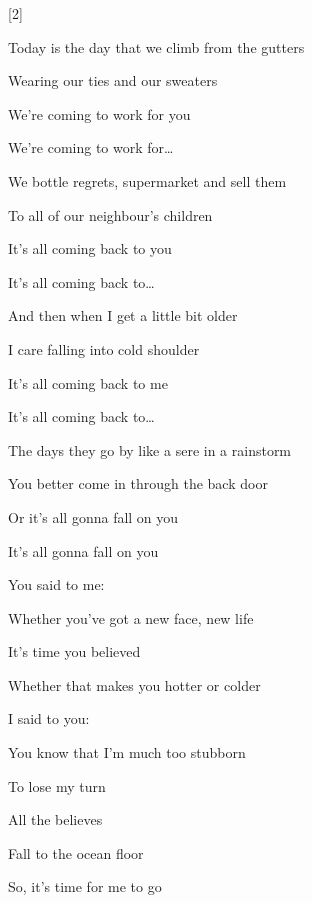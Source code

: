 [2]
\begin{strophe*}
  Today is the day that we climb from the gutters

  Wearing our ties and our sweaters

  We're coming to work for you

  We're coming to work for\dots{}
  
  
  We bottle regrets, supermarket and sell them

  To all of our neighbour's children

  It's all coming back to you

  \chord[c]{\null}It's all coming back to\dots
\end{strophe*}
\begin{strophe*}
  And then when I get a little bit older

  I care falling into cold shoulder

  It's all coming back to me

  It's all coming back to\dots{}
  

  The days they go by like a sere in a rainstorm

  You better come in through the back door

  Or it's all gonna fall on you

  It's all gonna fall on you
\end{strophe*}
\pagebreak
\begin{chorus*}
  You said to me:

  Whether you've got a new face, new life

  It's time you believed

  Whether that makes you hotter or colder


  I said to you:

  You know that I'm much too stubborn

  To lose my turn


  All the believes

  Fall to the ocean floor

  So, it's time for me to go
\end{chorus*}
